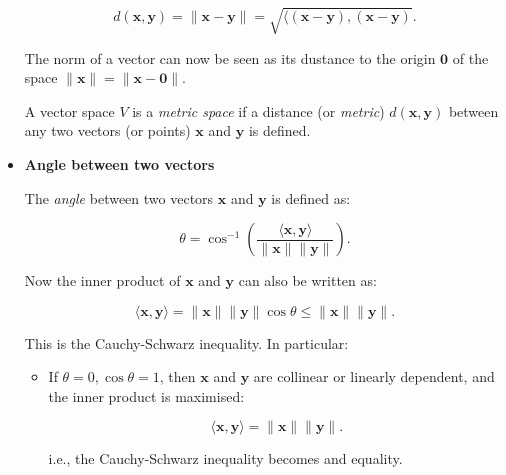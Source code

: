\documentclass[10pt,b5paper,titlepage]{book}
\begin{document}
\begin{itemize}
        \begin{equation}
            d(\mathbf{x}, \mathbf{y}) = \|\mathbf{x} - \mathbf{y}\|
            = \sqrt{\langle (\mathbf{x} - \mathbf{y}), (\mathbf{x} - \mathbf{y})}
        .\end{equation}

        The norm of a vector can now be seen as its dustance to the origin
        $\mathbf{0}$ of the space $\|\mathbf{x}\| = \|\mathbf{x} - \mathbf{0}\|$.

        A vector space $V$ is a \textit{metric space} if a distance
        (or \textit{metric}) $d(\mathbf{x}, \mathbf{y})$ between any two
        vectors (or points) $\mathbf{x}$ and $\mathbf{y}$ is defined.

    \item \textbf{Angle between two vectors}

        The \textit{angle} between two vectors $\mathbf{x}$ and $\mathbf{y}$
        is defined as:

        \begin{equation}
            \theta = \cos^{-1} \left( \frac{\langle \mathbf{x}, \mathbf{y} \rangle}{\|\mathbf{x}\| \|\mathbf{y}\|} \right)
        .\end{equation}

        Now the inner product of $\mathbf{x}$ and $\mathbf{y}$
        can also be written as:

        \begin{equation}
            \langle \mathbf{x}, \mathbf{y} \rangle
            = \|\mathbf{x}\| \|\mathbf{y}\| \cos \theta
            \le \|\mathbf{x}\| \|\mathbf{y}\|
        .\end{equation}

        This is the Cauchy-Schwarz inequality. In particular:

        \begin{itemize}
            \item If $\theta = 0, \cos \theta = 1$, then
                $\mathbf{x}$ and $\mathbf{y}$ are collinear or linearly
                dependent, and the inner product is maximised:

                \begin{equation}
                    \langle \mathbf{x}, \mathbf{y} \rangle
                    = \|\mathbf{x}\| \|\mathbf{y}\|
                .\end{equation}

                i.e., the Cauchy-Schwarz inequality becomes and equality.


\end{itemize}
\end{itemize}
\end{document}
